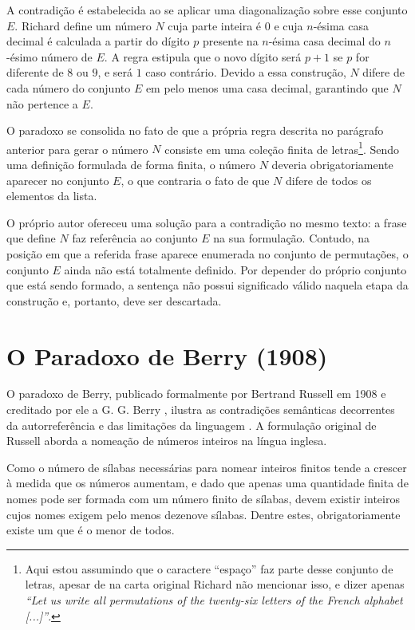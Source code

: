 A contradição é estabelecida ao se aplicar uma diagonalização sobre esse conjunto \(E\). Richard define um número \(N\) cuja parte inteira é \(0\) e cuja \(n\)-ésima casa decimal é calculada a partir do dígito \(p\) presente na \(n\)-ésima casa decimal do \(n\)-ésimo número de \(E\). A regra estipula que o novo dígito será \(p + 1\) se \(p\) for diferente de \(8\) ou \(9\), e será \(1\) caso contrário. Devido a essa construção, \(N\) difere de cada número do conjunto \(E\) em pelo menos uma casa decimal, garantindo que \(N\) não pertence a \(E\).



O paradoxo se consolida no fato de que a própria regra descrita no parágrafo anterior para gerar o número \(N\) consiste em uma coleção finita de letras\footnote{Aqui estou assumindo que o caractere ``espaço'' faz parte desse conjunto de letras, apesar de na carta original Richard não mencionar isso, e dizer apenas \emph{``Let us write all permutations of the twenty-six letters of the French alphabet [...]''}.}. Sendo uma definição formulada de forma finita, o número \(N\) deveria obrigatoriamente aparecer no conjunto \(E\), o que contraria o fato de que \(N\) difere de todos os elementos da lista.

O próprio autor ofereceu uma solução para a contradição no mesmo texto: a frase que define \(N\) faz referência ao conjunto \(E\) na sua formulação. Contudo, na posição em que a referida frase aparece enumerada no conjunto de permutações, o conjunto \(E\) ainda não está totalmente definido. Por depender do próprio conjunto que está sendo formado, a sentença não possui significado válido naquela etapa da construção e, portanto, deve ser descartada.


\section{O Paradoxo de Berry (1908)}

O paradoxo de Berry, publicado formalmente por Bertrand Russell em 1908 e creditado por ele a G. G. Berry \parencite[p.~150]{heijenoort1967}, ilustra as contradições semânticas decorrentes da autorreferência e das limitações da linguagem \parencite[p.~93]{rucker2019}. A formulação original de Russell aborda a nomeação de números inteiros na língua inglesa.

Como o número de sílabas necessárias para nomear inteiros finitos tende a crescer à medida que os números aumentam, e dado que apenas uma quantidade finita de nomes pode ser formada com um número finito de sílabas, devem existir inteiros cujos nomes exigem pelo menos dezenove sílabas. Dentre estes, obrigatoriamente existe um que é o menor de todos.


